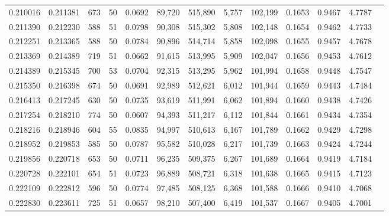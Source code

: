 \begin{tabular}{rrrrrrrrrrrrr}
0.210016 & 0.211381 &   673 &  50 &                                     0.0692 &  89,720 & 515,890 &   5,757 & 102,199 & 0.1653 & 0.9467 & 4.7787 \\
0.211390 & 0.212230 &   588 &  51 &                                     0.0798 &  90,308 & 515,302 &   5,808 & 102,148 & 0.1654 & 0.9462 & 4.7733 \\
0.212251 & 0.213365 &   588 &  50 &                                     0.0784 &  90,896 & 514,714 &   5,858 & 102,098 & 0.1655 & 0.9457 & 4.7678 \\
0.213369 & 0.214389 &   719 &  51 &                                     0.0662 &  91,615 & 513,995 &   5,909 & 102,047 & 0.1656 & 0.9453 & 4.7612 \\
0.214389 & 0.215345 &   700 &  53 &                                     0.0704 &  92,315 & 513,295 &   5,962 & 101,994 & 0.1658 & 0.9448 & 4.7547 \\
0.215350 & 0.216398 &   674 &  50 &                                     0.0691 &  92,989 & 512,621 &   6,012 & 101,944 & 0.1659 & 0.9443 & 4.7484 \\
0.216413 & 0.217245 &   630 &  50 &                                     0.0735 &  93,619 & 511,991 &   6,062 & 101,894 & 0.1660 & 0.9438 & 4.7426 \\
0.217254 & 0.218210 &   774 &  50 &                                     0.0607 &  94,393 & 511,217 &   6,112 & 101,844 & 0.1661 & 0.9434 & 4.7354 \\
0.218216 & 0.218946 &   604 &  55 &                                     0.0835 &  94,997 & 510,613 &   6,167 & 101,789 & 0.1662 & 0.9429 & 4.7298 \\
0.218952 & 0.219853 &   585 &  50 &                                     0.0787 &  95,582 & 510,028 &   6,217 & 101,739 & 0.1663 & 0.9424 & 4.7244 \\
0.219856 & 0.220718 &   653 &  50 &                                     0.0711 &  96,235 & 509,375 &   6,267 & 101,689 & 0.1664 & 0.9419 & 4.7184 \\
0.220728 & 0.222101 &   654 &  51 &                                     0.0723 &  96,889 & 508,721 &   6,318 & 101,638 & 0.1665 & 0.9415 & 4.7123 \\
0.222109 & 0.222812 &   596 &  50 &                                     0.0774 &  97,485 & 508,125 &   6,368 & 101,588 & 0.1666 & 0.9410 & 4.7068 \\
0.222830 & 0.223611 &   725 &  51 &                                     0.0657 &  98,210 & 507,400 &   6,419 & 101,537 & 0.1667 & 0.9405 & 4.7001 \\

\end{tabular}
